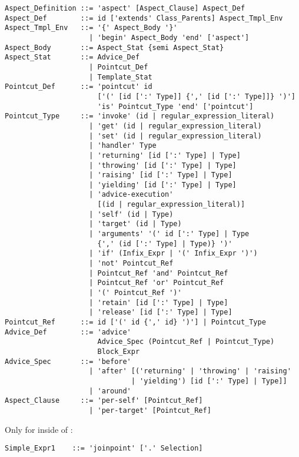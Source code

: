\syntax\begin{lstlisting}
Aspect_Definition ::= 'aspect' [Aspect_Clause] Aspect_Def
Aspect_Def        ::= id ['extends' Class_Parents] Aspect_Tmpl_Env
Aspect_Tmpl_Env   ::= '{' Aspect_Body '}'
                    | 'begin' Aspect_Body 'end' ['aspect']
Aspect_Body       ::= Aspect_Stat {semi Aspect_Stat}
Aspect_Stat       ::= Advice_Def
                    | Pointcut_Def
                    | Template_Stat
Pointcut_Def      ::= 'pointcut' id
                      ['(' [id [':' Type]] {',' [id [':' Type]]} ')']
                      'is' Pointcut_Type 'end' ['pointcut']
Pointcut_Type     ::= 'invoke' (id | regular_expression_literal)
                    | 'get' (id | regular_expression_literal)
                    | 'set' (id | regular_expression_literal)
                    | 'handler' Type
                    | 'returning' [id [':' Type] | Type]
                    | 'throwing' [id [':' Type] | Type]
                    | 'raising' [id [':' Type] | Type]
                    | 'yielding' [id [':' Type] | Type]
                    | 'advice-execution' 
                      [(id | regular_expression_literal)]
                    | 'self' (id | Type)
                    | 'target' (id | Type)
                    | 'arguments' '(' id [':' Type] | Type 
                      {',' (id [':' Type] | Type)} ')'
                    | 'if' (Infix_Expr | '(' Infix_Expr ')')
                    | 'not' Pointcut_Ref
                    | Pointcut_Ref 'and' Pointcut_Ref
                    | Pointcut_Ref 'or' Pointcut_Ref
                    | '(' Pointcut_Ref ')'
                    | 'retain' [id [':' Type] | Type]
                    | 'release' [id [':' Type] | Type]
Pointcut_Ref      ::= id ['(' id {',' id} ')'] | Pointcut_Type
Advice_Def        ::= 'advice' 
                      Advice_Spec (Pointcut_Ref | Pointcut_Type)
                      Block_Expr
Advice_Spec       ::= 'before' 
                    | 'after' [('returning' | 'throwing' | 'raising'
                              | 'yielding') [id [':' Type] | Type]]
                    | 'around'
Aspect_Clause     ::= 'per-self' [Pointcut_Ref] 
                    | 'per-target' [Pointcut_Ref] 
\end{lstlisting}

Only for  inside of :
\begin{lstlisting}
Simple_Expr1    ::= 'joinpoint' ['.' Selection]
\end{lstlisting}








